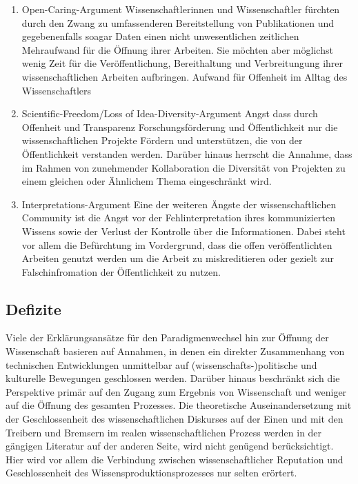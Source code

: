 \begin{enumerate}
\item Open-Caring-Argument
Wissenschaftlerinnen und Wissenschaftler fürchten durch den Zwang zu umfassenderen Bereitstellung von Publikationen und gegebenenfalls soagar Daten einen nicht unwesentlichen zeitlichen Mehraufwand für die Öffnung ihrer Arbeiten. Sie möchten aber möglichst wenig Zeit für die Veröffentlichung, Bereithaltung und Verbreitungung ihrer wissenschaftlichen Arbeiten aufbringen.
	Aufwand für Offenheit im Alltag des Wissenschaftlers
\item Scientific-Freedom/Loss of Idea-Diversity-Argument
Angst dass durch Offenheit und Transparenz Forschungsförderung und Öffentlichkeit nur die wissenschaftlichen Projekte Fördern und unterstützen, die von der Öffentlichkeit verstanden werden. Darüber hinaus herrscht die Annahme, dass im Rahmen von zunehmender Kollaboration die Diversität von Projekten zu einem gleichen oder Ähnlichem Thema eingeschränkt wird.
\item Interpretations-Argument
Eine der weiteren Ängste der wissenschaftlichen Community ist die Angst vor der Fehlinterpretation ihres kommunizierten Wissens sowie der Verlust der Kontrolle über die Informationen. Dabei steht vor allem die Befürchtung im Vordergrund, dass die offen veröffentlichten Arbeiten genutzt werden um die Arbeit zu miskreditieren oder gezielt zur Falschinfromation der Öffentlichkeit zu nutzen.
\end{enumerate}



\subsection{Defizite}
Viele der Erklärungsansätze für den Paradigmenwechsel hin zur Öffnung der Wissenschaft basieren auf Annahmen, in denen ein direkter Zusammenhang von technischen Entwicklungen unmittelbar auf (wissenschafts-)politische und kulturelle Bewegungen geschlossen werden. Darüber hinaus beschränkt sich die Perspektive primär auf den Zugang zum Ergebnis von Wissenschaft und weniger auf die Öffnung des gesamten Prozesses. Die theoretische Auseinandersetzung mit der Geschlossenheit des wissenschaftlichen Diskurses  auf der Einen und mit den Treibern und Bremsern im realen wissenschaftlichen Prozess werden in der gängigen Literatur auf der anderen Seite, wird nicht genügend berücksichtigt. Hier wird vor allem die Verbindung zwischen wissenschaftlicher Reputation und Geschlossenheit des Wissensproduktionsprozesses nur selten erörtert.
